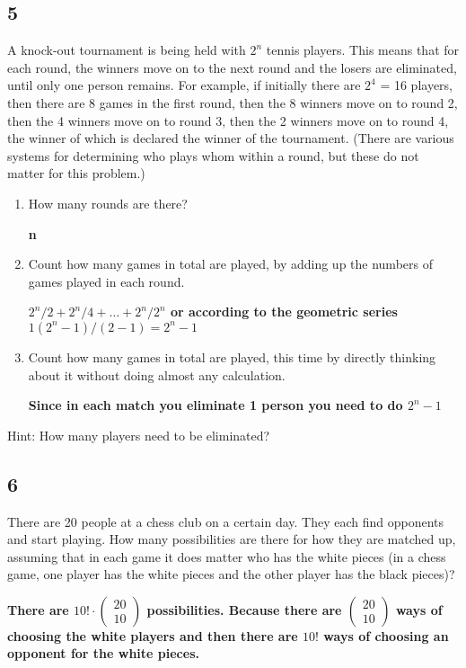 \documentclass{article}
\begin{document}
\subsection{5}
A knock-out tournament is being held with $2^n$ tennis players. This means that for each round, the winners move on to the next round and the losers are eliminated, until only one person remains. For example, if initially there are $2^4$ = 16 players, then there are 8 games in the first round, then the 8 winners move on to round 2, then the 4 winners move on to round 3, then the 2 winners move on to round 4, the winner of which is declared the winner of the tournament. (There are various systems for determining who plays whom within a round, but these do not matter for this problem.)
\begin{enumerate}
    \item  How many rounds are there?
    
    \textbf{n}

    \item Count how many games in total are played, by adding up the numbers of games played in each round.
    
    \textbf{$2^n/2+2^n/4+\dots+2^n/2^n$ or according to the geometric series $1(2^n-1)/(2-1)=2^n-1$}

    \item Count how many games in total are played, this time by directly thinking about it without doing almost any calculation.
    
    \textbf{Since in each match you eliminate 1 person you need to do $2^n - 1$}
    
\end{enumerate}
Hint: How many players need to be eliminated?
\subsection{6}
There are 20 people at a chess club on a certain day. They each find opponents and start playing. How many possibilities are there for how they are matched up, assuming that in each game it does matter who has the white pieces (in a chess game, one player has the white pieces and the other player has the black pieces)?

\textbf{
There are 
$10 ! \cdot \begin{pmatrix}
    20\\
    10
\end{pmatrix}$ possibilities. Because there are $\begin{pmatrix}
    20\\
    10
\end{pmatrix}$ ways of choosing the white players and then there are $10!$ ways of choosing an opponent for the white pieces.}
\end{document}
